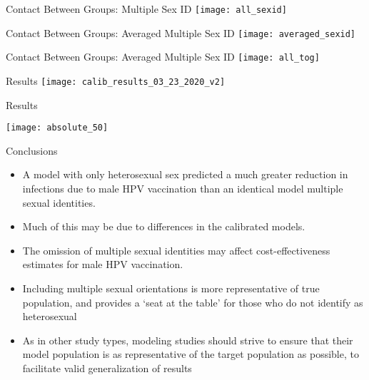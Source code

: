\documentclass[aspectratio=169]{beamer}
\begin{document}
\begin{frame}{Contact Between Groups: Multiple Sex ID}
    \centering
    \texttt{[image: all\_sexid]}
\end{frame}

\begin{frame}{Contact Between Groups: Averaged Multiple Sex ID}
    \centering
    \texttt{[image: averaged\_sexid]}
\end{frame}

\begin{frame}{Contact Between Groups: Averaged Multiple Sex ID}
    \centering
    \texttt{[image: all\_tog]}
\end{frame}

\begin{frame}{Results}
    \centering
    \texttt{[image: calib\_results\_03\_23\_2020\_v2]}
\end{frame}

\begin{frame}{Results}
    \begin{center}
        \texttt{[image: absolute\_50]}
    \end{center}
\end{frame}


\begin{frame}{Conclusions}
    \begin{itemize}
            \pause
            \item A model with only heterosexual sex predicted a much greater reduction in infections due to male HPV vaccination than an identical model multiple sexual identities.
            \pause
            \item Much of this may be due to differences in the calibrated models.
            \pause
            \item The omission of multiple sexual identities may affect cost-effectiveness estimates for male HPV vaccination.
            \pause
            \item Including multiple sexual orientations is more representative of true population, and provides a `seat at the table' for those who do not identify as heterosexual
            \pause
            \item As in other study types, modeling studies should strive to ensure that their model population is as representative of the target population as possible, to facilitate valid generalization of results
    \end{itemize}
\end{frame}
\end{document}
